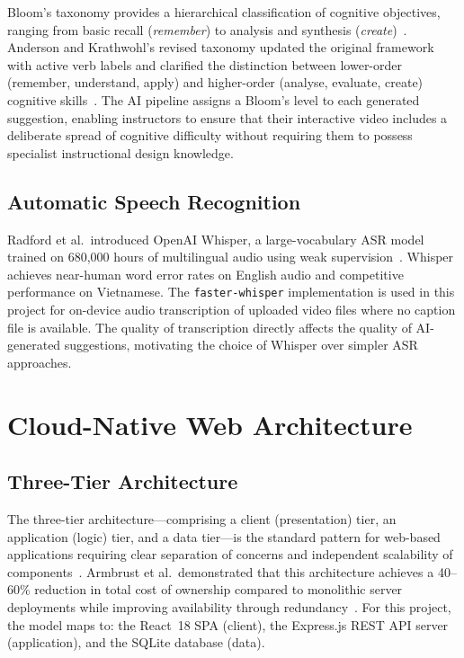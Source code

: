 Bloom's taxonomy provides a hierarchical classification of cognitive
objectives, ranging from basic recall (\emph{remember}) to analysis and
synthesis (\emph{create})~\cite{bloom1956}. Anderson and Krathwohl's
revised taxonomy updated the original framework with active verb labels and
clarified the distinction between lower-order (remember, understand, apply)
and higher-order (analyse, evaluate, create) cognitive
skills~\cite{anderson2001}. The AI pipeline assigns a Bloom's level to
each generated suggestion, enabling instructors to ensure that their
interactive video includes a deliberate spread of cognitive difficulty
without requiring them to possess specialist instructional design knowledge.

\subsection{Automatic Speech Recognition}

Radford et al.\ introduced OpenAI Whisper, a large-vocabulary ASR model
trained on 680,000 hours of multilingual audio using weak
supervision~\cite{radford2023}. Whisper achieves near-human word error
rates on English audio and competitive performance on Vietnamese. The
\texttt{faster-whisper} implementation is used in this project for on-device
audio transcription of uploaded video files where no caption file is
available. The quality of transcription directly affects the quality of
AI-generated suggestions, motivating the choice of Whisper over simpler
ASR approaches.

\section{Cloud-Native Web Architecture}

\subsection{Three-Tier Architecture}

The three-tier architecture---comprising a client (presentation) tier, an
application (logic) tier, and a data tier---is the standard pattern for
web-based applications requiring clear separation of concerns and
independent scalability of components~\cite{bass2012}. Armbrust et al.\
demonstrated that this architecture achieves a 40--60\% reduction in total
cost of ownership compared to monolithic server deployments while improving
availability through redundancy~\cite{armbrust2010}. For this project, the
model maps to: the React~18 SPA (client), the Express.js REST API server
(application), and the SQLite database (data).

